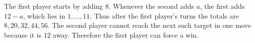 The first player starts by adding $ 8 $. Whenever the second adds $ a $, the first adds $ 12-a $, which lies in $ 1,\ldots,11 $. Thus after the first player's turns the totals are $ 8,20,32,44,56 $. The second player cannot reach the next such target in one move because it is $ 12 $ away. Therefore the first player can force a win.
